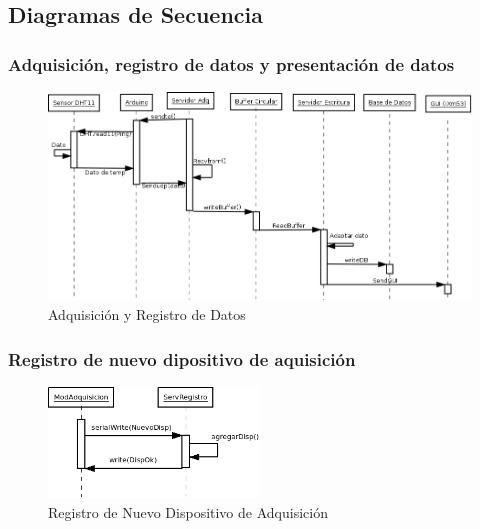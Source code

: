\newpage
\subsection{\textcolor[gray]{.2}{Diagramas de Secuencia}}
\subsubsection{\textcolor[gray]{.2}{Adquisición, registro de datos y presentación de datos}}
\begin{figure}[h!]
 \begin{center}
  \includegraphics[width=1\textwidth,keepaspectratio=true]{img/Diagrama_secuencia.png}
  \caption{Adquisición y Registro de Datos}
  \label{fig:esquema}
 \end{center}
\end{figure}
\subsubsection{\textcolor[gray]{.2}{Registro de nuevo dipositivo de aquisición}}
\begin{figure}[h!]
 \begin{center}
  \includegraphics[width=0.5\textwidth,keepaspectratio=true]{img/agregardisp.png}
  \caption{Registro de Nuevo Dispositivo de Adquisición}
  \label{fig:esquema}
 \end{center}
\end{figure}

\newpage
